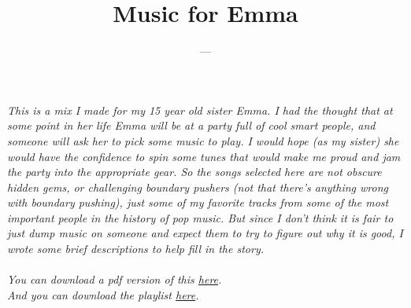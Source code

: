\documentclass[letterpaper,single]{article}
\title{Music for Emma}
\date{}
\author{---}
\begin{document}
 
\maketitle
\itshape
This is a mix I made for my 15 year old sister Emma.
I had the thought that at some point in her life Emma will be at a party full of cool smart people, and someone will ask her to pick some music to play. I would hope (as my sister) she would have the confidence to spin some tunes that would make me proud and jam the party into the appropriate gear.
So the songs selected here are not obscure hidden gems, or challenging boundary pushers (not that there's anything wrong with boundary pushing), just some of my favorite tracks from some of the most important people in the history of pop music.
But since I don't think it is fair to just dump music on someone and expect them to try to figure out why it is good, I wrote some brief descriptions to help fill in the story.\\
\\
You can download a pdf version of this \href{http://dynohub.net/musicforemma/texfiles/MusicforEmma.pdf}{here}.\\
And you can download the playlist \href{http://dynohub.net/musicforemma/musicforemma-tracks.zip}{here}.\\
\upshape
\end{document}
